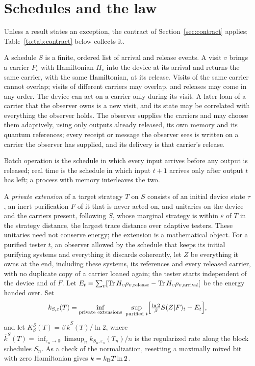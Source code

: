 \section{Schedules and the law}\label{to:sec:law}\label{sec:law}

Unless a result states an exception, the contract of Section~\ref{sec:contract} applies; Table~\ref{to:tab:contract} below collects it.

\begin{definition}[Schedule]\label{to:def:schedule}
A schedule $S$ is a finite, ordered list of arrival and release events. A visit $v$ brings a carrier $P_v$ with Hamiltonian $H_v$ into the device at its arrival and returns the same carrier, with the same Hamiltonian, at its release. Visits of the same carrier cannot overlap; visits of different carriers may overlap, and releases may come in any order. The device can act on a carrier only during its visit. A later loan of a carrier that the observer owns is a new visit, and its state may be correlated with everything the observer holds. The observer supplies the carriers and may choose them adaptively, using only outputs already released, its own memory and its quantum references; every receipt or message the observer sees is written on a carrier the observer has supplied, and its delivery is that carrier's release.
\end{definition}

Batch operation is the schedule in which every input arrives before any output is released; real time is the schedule in which input $t+1$ arrives only after output $t$ has left; a process with memory interleaves the two.

\begin{definition}\label{to:def:functional}
A \emph{private extension} of a target strategy $T$ on $S$ consists of an initial device state $\tau$, an inert purification $F$ of it that is never acted on, and unitaries on the device and the carriers present, following $S$, whose marginal strategy is within $\varepsilon$ of $T$ in the strategy distance, the largest trace distance over adaptive testers. These unitaries need not conserve energy; the extension is a mathematical object. For a purified tester $t$, an observer allowed by the schedule that keeps its initial purifying systems and everything it discards coherently, let $Z$ be everything it owns at the end, including these systems, its references and every released carrier, with no duplicate copy of a carrier loaned again; the tester starts independent of the device and of $F$. Let $E_t=\sum_v[\operatorname{Tr} H_v\rho_{v,\mathrm{release}}-\operatorname{Tr} H_v\rho_{v,\mathrm{arrival}}]$ be the energy handed over. Set
\[
k_{S,\varepsilon}(T)=\inf_{\text{private extensions}}\ \sup_{\text{purified }t}\Bigl[\tfrac{\ln2}\beta S(Z|F)_t+E_t\Bigr],
\]
and let $K_\beta^S(T)=\beta\,\bar k^S(T)/\ln2$, where $\bar k^S(T)=\inf_{\varepsilon_n\to0}\limsup_n k_{S_n,\varepsilon_n}(T_n)/n$ is the regularized rate along the block schedules $S_n$. As a check of the normalization, resetting a maximally mixed bit with zero Hamiltonian gives $k=k_{\mathrm B} T\ln2$.
\end{definition}

